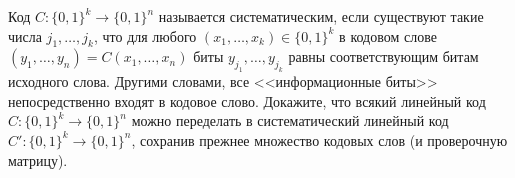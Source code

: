 Код $C\colon \{0, 1\}^k \rightarrow \{0, 1\}^n$ называется систематическим, если существуют такие числа
$j_1, \dots, j_k$, что для любого $(x_1, \dots, x_k) \in \{0, 1\}^k$ в кодовом слове $(y_1, \dots, y_n) =
C(x_1, \dots, x_n)$ биты $y_{j_1}, \dots, y_{j_k}$ равны соответствующим битам исходного слова. Другими
словами, все <<информационные биты>> непосредственно входят в кодовое слово. Докажите, что всякий
линейный код $C\colon \{0, 1\}^k \rightarrow \{0, 1\}^n$ можно переделать в систематический линейный код
$C'\colon \{0, 1\}^k \rightarrow \{0, 1\}^n$, сохранив прежнее множество кодовых слов (и проверочную
матрицу).